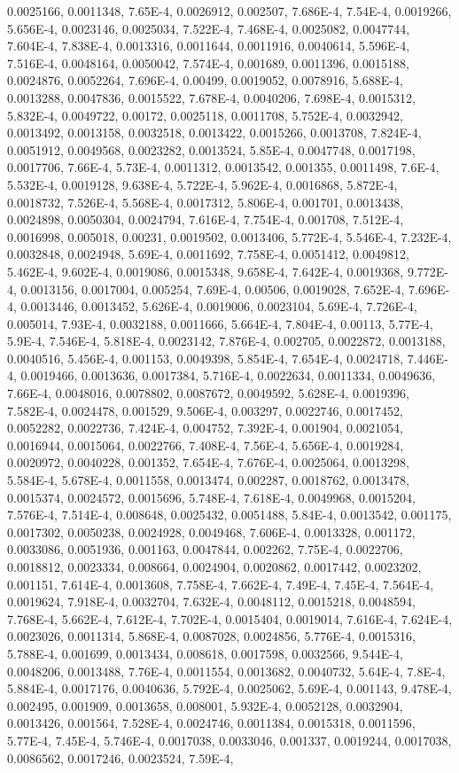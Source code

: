 0.0025166, 0.0011348, 7.65E-4, 0.0026912, 0.002507, 7.686E-4, 7.54E-4, 0.0019266, 5.656E-4, 0.0023146, 0.0025034, 7.522E-4, 7.468E-4, 0.0025082, 0.0047744, 7.604E-4, 7.838E-4, 0.0013316, 0.0011644, 0.0011916, 0.0040614, 5.596E-4, 7.516E-4, 0.0048164, 0.0050042, 7.574E-4, 0.001689, 0.0011396, 0.0015188, 0.0024876, 0.0052264, 7.696E-4, 0.00499, 0.0019052, 0.0078916, 5.688E-4, 0.0013288, 0.0047836, 0.0015522, 7.678E-4, 0.0040206, 7.698E-4, 0.0015312, 5.832E-4, 0.0049722, 0.00172, 0.0025118, 0.0011708, 5.752E-4, 0.0032942, 0.0013492, 0.0013158, 0.0032518, 0.0013422, 0.0015266, 0.0013708, 7.824E-4, 0.0051912, 0.0049568, 0.0023282, 0.0013524, 5.85E-4, 0.0047748, 0.0017198, 0.0017706, 7.66E-4, 5.73E-4, 0.0011312, 0.0013542, 0.001355, 0.0011498, 7.6E-4, 5.532E-4, 0.0019128, 9.638E-4, 5.722E-4, 5.962E-4, 0.0016868, 5.872E-4, 0.0018732, 7.526E-4, 5.568E-4, 0.0017312, 5.806E-4, 0.001701, 0.0013438, 0.0024898, 0.0050304, 0.0024794, 7.616E-4, 7.754E-4, 0.001708, 7.512E-4, 0.0016998, 0.005018, 0.00231, 0.0019502, 0.0013406, 5.772E-4, 5.546E-4, 7.232E-4, 0.0032848, 0.0024948, 5.69E-4, 0.0011692, 7.758E-4, 0.0051412, 0.0049812, 5.462E-4, 9.602E-4, 0.0019086, 0.0015348, 9.658E-4, 7.642E-4, 0.0019368, 9.772E-4, 0.0013156, 0.0017004, 0.005254, 7.69E-4, 0.00506, 0.0019028, 7.652E-4, 7.696E-4, 0.0013446, 0.0013452, 5.626E-4, 0.0019006, 0.0023104, 5.69E-4, 7.726E-4, 0.005014, 7.93E-4, 0.0032188, 0.0011666, 5.664E-4, 7.804E-4, 0.00113, 5.77E-4, 5.9E-4, 7.546E-4, 5.818E-4, 0.0023142, 7.876E-4, 0.002705, 0.0022872, 0.0013188, 0.0040516, 5.456E-4, 0.001153, 0.0049398, 5.854E-4, 7.654E-4, 0.0024718, 7.446E-4, 0.0019466, 0.0013636, 0.0017384, 5.716E-4, 0.0022634, 0.0011334, 0.0049636, 7.66E-4, 0.0048016, 0.0078802, 0.0087672, 0.0049592, 5.628E-4, 0.0019396, 7.582E-4, 0.0024478, 0.001529, 9.506E-4, 0.003297, 0.0022746, 0.0017452, 0.0052282, 0.0022736, 7.424E-4, 0.004752, 7.392E-4, 0.001904, 0.0021054, 0.0016944, 0.0015064, 0.0022766, 7.408E-4, 7.56E-4, 5.656E-4, 0.0019284, 0.0020972, 0.0040228, 0.001352, 7.654E-4, 7.676E-4, 0.0025064, 0.0013298, 5.584E-4, 5.678E-4, 0.0011558, 0.0013474, 0.002287, 0.0018762, 0.0013478, 0.0015374, 0.0024572, 0.0015696, 5.748E-4, 7.618E-4, 0.0049968, 0.0015204, 7.576E-4, 7.514E-4, 0.008648, 0.0025432, 0.0051488, 5.84E-4, 0.0013542, 0.001175, 0.0017302, 0.0050238, 0.0024928, 0.0049468, 7.606E-4, 0.0013328, 0.001172, 0.0033086, 0.0051936, 0.001163, 0.0047844, 0.002262, 7.75E-4, 0.0022706, 0.0018812, 0.0023334, 0.008664, 0.0024904, 0.0020862, 0.0017442, 0.0023202, 0.001151, 7.614E-4, 0.0013608, 7.758E-4, 7.662E-4, 7.49E-4, 7.45E-4, 7.564E-4, 0.0019624, 7.918E-4, 0.0032704, 7.632E-4, 0.0048112, 0.0015218, 0.0048594, 7.768E-4, 5.662E-4, 7.612E-4, 7.702E-4, 0.0015404, 0.0019014, 7.616E-4, 7.624E-4, 0.0023026, 0.0011314, 5.868E-4, 0.0087028, 0.0024856, 5.776E-4, 0.0015316, 5.788E-4, 0.001699, 0.0013434, 0.008618, 0.0017598, 0.0032566, 9.544E-4, 0.0048206, 0.0013488, 7.76E-4, 0.0011554, 0.0013682, 0.0040732, 5.64E-4, 7.8E-4, 5.884E-4, 0.0017176, 0.0040636, 5.792E-4, 0.0025062, 5.69E-4, 0.001143, 9.478E-4, 0.002495, 0.001909, 0.0013658, 0.008001, 5.932E-4, 0.0052128, 0.0032904, 0.0013426, 0.001564, 7.528E-4, 0.0024746, 0.0011384, 0.0015318, 0.0011596, 5.77E-4, 7.45E-4, 5.746E-4, 0.0017038, 0.0033046, 0.001337, 0.0019244, 0.0017038, 0.0086562, 0.0017246, 0.0023524, 7.59E-4, 